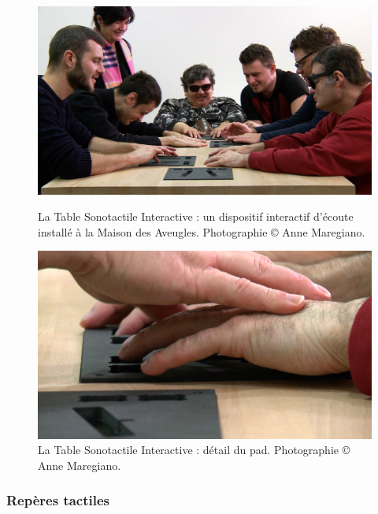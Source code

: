 \begin{figure}[!htbp]
	\captionsetup{format=plain}%
	\centering
	\begin{minipage}[t]{0.48\textwidth}
		\includegraphics[width=\linewidth]{gfx/05_interfaces/tableSonotactile.jpg}
		\caption[La Table Sonotactile Interactive]{La Table Sonotactile Interactive : un dispositif interactif d'écoute installé à la Maison des Aveugles. Photographie © Anne Maregiano.}
		\label{fig:interface:tableSonotactile}
	\end{minipage}
	\hspace{.02\linewidth}
	\begin{minipage}[t]{0.48\textwidth}
	    \includegraphics[width=\linewidth]{gfx/05_interfaces/tableSonotactile-pad.jpg}
		\caption[La Table Sonotactile Interactive : détail du pad]{La Table Sonotactile Interactive : détail du pad. Photographie © Anne Maregiano.}
		\label{fig:interface:tableSonotactile-pad}
	\end{minipage}
\end{figure}

\subsubsection{Repères tactiles}

